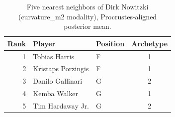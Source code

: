 \begin{table}[htbp]
  \centering\small
  \begin{tabular}{rllc}
    \toprule
    Rank & Player & Position & Archetype \\
    \midrule
    1 & Tobias Harris & F & 1 \\
    2 & Kristaps Porzingis & F & 1 \\
    3 & Danilo Gallinari & G & 2 \\
    4 & Kemba Walker & G & 1 \\
    5 & Tim Hardaway Jr. & G & 2 \\
    \bottomrule
  \end{tabular}
  \caption{Five nearest neighbors of Dirk Nowitzki (curvature_m2 modality), Procrustes-aligned posterior mean.}
  \label{tab:Dirk_Nowitzki_neighbors_curvature_m2}
\end{table}

